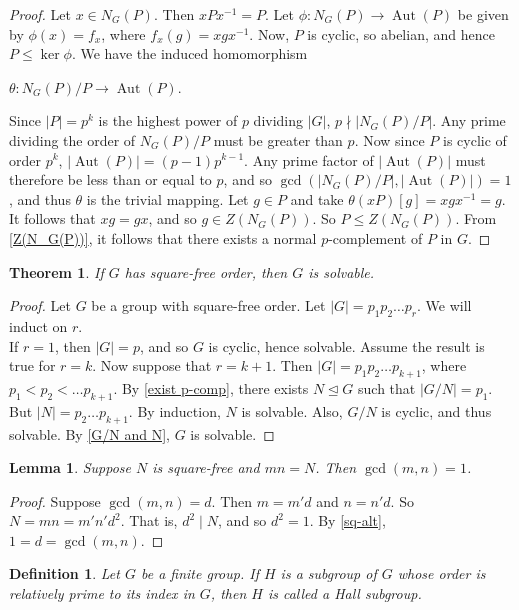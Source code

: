 \documentclass[12pt]{report}
\theoremstyle{newthm}
\newtheorem{Theorem}[lem]{Theorem}
\newtheorem{Definition}[lem]{Definition}
\newtheorem{Lemma}[lem]{Lemma}
\DeclareMathOperator{\Aut}{Aut}
\begin{document}
\begin{proof}
Let $x\in N_G(P)$. Then $xPx^{-1}=P$. 
Let $\phi: N_G(P)\rightarrow \Aut(P)$ be given by $\phi(x)= f_x$, where $f_x(g)=xgx^{-1}$. Now, $P$ is cyclic, so abelian, and hence $P\leq \ker\phi$. We have the induced homomorphism  \begin{center}
    
$\theta:N_G(P)/P\rightarrow \Aut(P)$.\end{center}
Since $|P|=p^k$ is the highest power of $p$ dividing $|G|$, $p\nmid |N_G(P)/P|$. Any prime dividing the order of $N_G(P)/P$ must be greater than $p$. Now since $P$ is cyclic of order $p^k$, $|\Aut(P)|=(p-1)p^{k-1}$. Any prime factor of $|\Aut(P)|$ must therefore be less than or equal to $p$, and so $\gcd(|N_G(P)/P|,|\Aut(P)|)=1$, and thus $\theta$ is the trivial mapping. Let $g\in P$ and take $\theta(xP)[g]=xgx^{-1}=g$. It follows that $xg=gx$, and so $g\in Z(N_G(P))$. So $P\leq Z(N_G(P)).$ From \cref{Z(N_G(P))}, it follows that there exists a normal $p$-complement of $P$ in $G$.
\end{proof}

\begin{Theorem}\label{square free solvable} If $G$ has square-free order, then $G$ is solvable. 
\end{Theorem}

\begin{proof}
Let $G$ be a group with square-free order. Let $|G|=p_1p_2\dots p_r$. We will induct on $r$.\\
If $r=1$, then $|G|=p$, and so $G$ is cyclic, hence solvable. Assume the result is true for $r=k$. Now suppose that
$r=k+1$. Then $|G|=p_1p_2\dots p_{k+1}$, where $p_1<p_2<\dots p_{k+1}$. By \cref{exist p-comp}, there exists $N\trianglelefteq G$ such that $|G/N|=p_1$. But $|N|=p_2\dots p_{k+1}$. By induction, $N$ is solvable. Also, $G/N$ is cyclic, and thus solvable. By \cref{G/N and N}, $G$ is solvable.
\end{proof}

\begin{Lemma}\label{mn=N} Suppose $N$ is square-free and $mn=N$. Then $\gcd(m,n)=1$.
\end{Lemma}

\begin{proof}
Suppose $\gcd(m,n)=d$. Then $m=m'd$ and $n=n'd$. So $N=mn=m'n'd^2$. That is, $d^2\mid N$, and so $d^2=1$. By \cref{sq-alt}, $1=d=\gcd(m,n)$.
\end{proof}

\begin{Definition} Let $G$ be a finite group. If $H$ is a subgroup of $G$ whose order is relatively prime to its index in $G$, then $H$ is called a \textit{Hall subgroup}.
\end{Definition}
\end{document}
